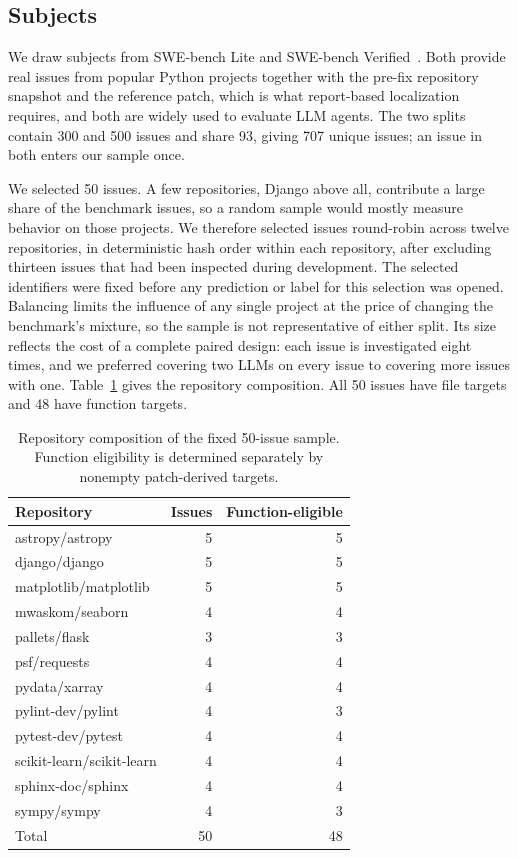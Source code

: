 \documentclass[a4paper,fleqn]{cas-sc}
\begin{document}
\subsection{Subjects}\label{sec:subjects}
We draw subjects from SWE-bench Lite and SWE-bench Verified~\citep{swebench2024,swebenchverified2024}. Both provide real issues from popular Python projects together with the pre-fix repository snapshot and the reference patch, which is what report-based localization requires, and both are widely used to evaluate LLM agents. The two splits contain 300 and 500 issues and share 93, giving 707 unique issues; an issue in both enters our sample once.

We selected 50 issues. A few repositories, Django above all, contribute a large share of the benchmark issues, so a random sample would mostly measure behavior on those projects. We therefore selected issues round-robin across twelve repositories, in deterministic hash order within each repository, after excluding thirteen issues that had been inspected during development. The selected identifiers were fixed before any prediction or label for this selection was opened. Balancing limits the influence of any single project at the price of changing the benchmark's mixture, so the sample is not representative of either split. Its size reflects the cost of a complete paired design: each issue is investigated eight times, and we preferred covering two LLMs on every issue to covering more issues with one. Table~\ref{tab:eval-coverage} gives the repository composition. All 50 issues have file targets and 48 have function targets.

\begin{table}[pos=!htbp]
\caption{Repository composition of the fixed 50-issue sample. Function eligibility is determined separately by nonempty patch-derived targets.}\label{tab:eval-coverage}
\centering\small
\begin{tabular*}{\textwidth}{@{\extracolsep{\fill}}lrr@{}}\toprule
Repository & Issues & Function-eligible\\\midrule
astropy/astropy & 5 & 5\\
django/django & 5 & 5\\
matplotlib/matplotlib & 5 & 5\\
mwaskom/seaborn & 4 & 4\\
pallets/flask & 3 & 3\\
psf/requests & 4 & 4\\
pydata/xarray & 4 & 4\\
pylint-dev/pylint & 4 & 3\\
pytest-dev/pytest & 4 & 4\\
scikit-learn/scikit-learn & 4 & 4\\
sphinx-doc/sphinx & 4 & 4\\
sympy/sympy & 4 & 3\\
\midrule Total & 50 & 48\\
\bottomrule\end{tabular*}
\end{table}
\end{document}
